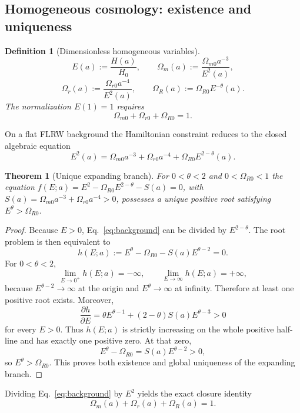 \documentclass[11pt,a4paper]{article}
\newtheorem{definition}[axiom]{Definition}
\newtheorem{theorem}[axiom]{Theorem}
\newcommand{\Boxed}[1]{\boxed{\displaystyle #1}}
\begin{document}
\subsection{Homogeneous cosmology: existence and uniqueness}

\begin{definition}[Dimensionless homogeneous variables]
\[
E(a):=\frac{H(a)}{H_0},
\qquad
\Omega_m(a):=\frac{\Omega_{m0}a^{-3}}{E^2(a)},
\]
\[
\Omega_r(a):=\frac{\Omega_{r0}a^{-4}}{E^2(a)},
\qquad
\Omega_R(a):=\Omega_{R0}E^{-\theta}(a).
\]
The normalization \(E(1)=1\) requires
\[
\Omega_{m0}+\Omega_{r0}+\Omega_{R0}=1.
\]
\end{definition}

On a flat FLRW background the Hamiltonian constraint reduces to the closed algebraic equation
\begin{equation}
\Boxed{E^2(a)=\Omega_{m0}a^{-3}+\Omega_{r0}a^{-4}+\Omega_{R0}E^{2-\theta}(a).}
\label{eq:background}
\end{equation}

\begin{theorem}[Unique expanding branch]
For \(0<\theta<2\) and \(0<\Omega_{R0}<1\) the equation \(f(E;a)=E^2-\Omega_{R0}E^{2-\theta}-S(a)=0\), with \(S(a)=\Omega_{m0}a^{-3}+\Omega_{r0}a^{-4}>0\), possesses a unique positive root satisfying \(E^\theta>\Omega_{R0}\).
\end{theorem}

\begin{proof}
Because \(E>0\), Eq.~\eqref{eq:background} can be divided by \(E^{2-\theta}\). The root problem is then equivalent to
\[
h(E;a):=
E^\theta-\Omega_{R0}-S(a)E^{\theta-2}=0.
\]
For \(0<\theta<2\),
\[
\lim_{E\to0^+}h(E;a)=-\infty,
\qquad
\lim_{E\to\infty}h(E;a)=+\infty,
\]
because \(E^{\theta-2}\to\infty\) at the origin and \(E^\theta\to\infty\) at infinity. Therefore at least one positive root exists. Moreover,
\[
\frac{\partial h}{\partial E}
=
\theta E^{\theta-1}
+(2-\theta)S(a)E^{\theta-3}>0
\]
for every \(E>0\). Thus \(h(E;a)\) is strictly increasing on the whole positive half-line and has exactly one positive zero. At that zero,
\[
E^\theta-\Omega_{R0}=S(a)E^{\theta-2}>0,
\]
so \(E^\theta>\Omega_{R0}\). This proves both existence and global uniqueness of the expanding branch.
\end{proof}

Dividing Eq.~\eqref{eq:background} by \(E^2\) yields the exact closure identity
\[
\Omega_m(a)+\Omega_r(a)+\Omega_R(a)=1.
\]
\end{document}
